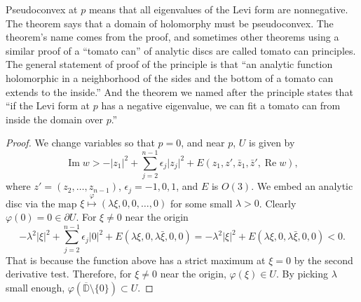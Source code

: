 \documentclass[12pt,openany]{book}
\renewcommand{\Re}{\operatorname{Re}}
\renewcommand{\Im}{\operatorname{Im}}
\newcommand{\sabs}[1]{\lvert {#1} \rvert}
\newcommand{\D}{{\mathbb{D}}}
\theoremstyle{plain}
\theoremstyle{remark}
\theoremstyle{definition}
\theoremstyle{exercise}
\theoremstyle{example}
\begin{document}
Pseudoconvex at $p$ means that all eigenvalues of the Levi form are
nonnegative.
The theorem says that a domain of holomorphy must be pseudoconvex.
The theorem's name comes from the proof, and sometimes other theorems using a
similar proof of a ``tomato can'' of analytic discs are called
tomato can principles.
The general statement of proof of the principle is that ``an
analytic function holomorphic in a neighborhood of the sides and the bottom
of a tomato can extends to the inside.''  And the theorem we named after
the principle states that ``if the Levi form at $p$ has a negative
eigenvalue, we can fit a tomato can from inside the domain over $p$.''

\begin{proof}
We change variables so that $p = 0$, and
near $p$, $U$ is given by
\begin{equation*}
\Im w > -\sabs{z_1}^2 + \sum_{j=2}^{n-1} \epsilon_j \sabs{z_j}^2 +
E(z_1,z',\bar{z}_1,\bar{z}',\Re w) ,
\end{equation*}
where $z' = (z_2,\ldots,z_{n-1})$, $\epsilon_j = -1,0,1$, and $E$ is $O(3)$.
We embed an analytic disc via the map
$\xi \overset{\varphi}{\mapsto} (\lambda \xi, 0, 0, \ldots, 0)$
for some small $\lambda > 0$.
Clearly $\varphi(0) = 0 \in \partial U$.  For $\xi \not= 0$ near the origin
\begin{equation*}
-\lambda^2 \sabs{\xi}^2 + \sum_{j=2}^{n-1} \epsilon_j \sabs{0}^2 + E(\lambda
\xi,0,\lambda \bar{\xi},0,0)
=
-\lambda^2 \sabs{\xi}^2 + E(\lambda
\xi,0,\lambda \bar{\xi},0,0)
< 0 .
\end{equation*}
That is because
the function above has a strict maximum at $\xi = 0$
by the second derivative test.
Therefore, for $\xi \not= 0$ near the origin,
$\varphi(\xi) \in U$.  By picking $\lambda$ small enough,
$\varphi(\overline{\D}\setminus\{0\}) \subset U$.


\end{proof}
\end{document}
